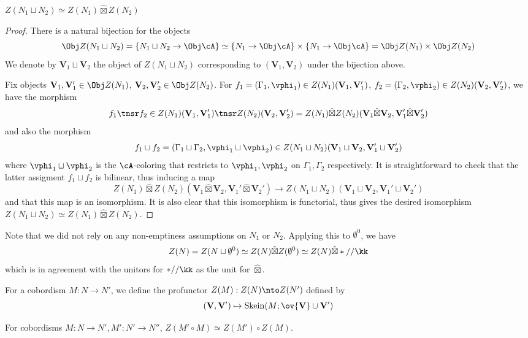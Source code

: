 \documentclass[12pt]{article}
\newcommand{\empt}[1]{{\emptyset^{#1}}}
\newcommand{\VV}{{\mathbf{V}}}
\DeclareMathOperator{\Skein}{Skein}
\newcommand{\hatbox}{{\hat{\boxtimes}}}
\begin{document}
\begin{proposition}
$Z(N_1 \sqcup N_2) \simeq Z(N_1) \hatbox Z(N_2)$
\end{proposition}

\begin{proof}
There is a natural bijection for the objects
\[
\Obj Z(N_1 \sqcup N_2) = \{N_1 \sqcup N_2 \to \Obj \cA\}
\simeq \{N_1 \to \Obj \cA\} \times \{N_1 \to \Obj \cA\}
= \Obj Z(N_1) \times \Obj Z(N_2)
\]
We denote by $\VV_1 \sqcup \VV_2$ the object of $Z(N_1 \sqcup N_2)$
corresponding to $(\VV_1,\VV_2)$ under the bijection above.

Fix objects $\VV_1,\VV_1' \in \Obj Z(N_1)$,
$\VV_2,\VV_2' \in \Obj Z(N_2)$.
For $f_1 = (\Gamma_1,\vphi_1) \in Z(N_1)(\VV_1,\VV_1')$,
$f_2 = (\Gamma_2,\vphi_2) \in Z(N_2)(\VV_2,\VV_2')$,
we have the morphism
\[
f_1 \tnsr f_2 \in
Z(N_1)(\VV_1,\VV_1') \tnsr Z(N_2)(\VV_2,\VV_2')
= Z(N_1) \hatbox Z(N_2)(\VV_1 \hatbox \VV_2, \VV_1' \hatbox \VV_2')
\]
and also the morphism
\[
f_1 \sqcup f_2 = (\Gamma_1 \sqcup \Gamma_2, \vphi_1 \sqcup \vphi_2)
\in Z(N_1 \sqcup N_2) (\VV_1 \sqcup \VV_2, \VV_1' \sqcup \VV_2')
\]
where $\vphi_1 \sqcup \vphi_2$ is the $\cA$-coloring that
restricts to $\vphi_1,\vphi_2$ on $\Gamma_1,\Gamma_2$ respectively.
It is straightforward to check that
the latter assigment $f_1 \sqcup f_2$ is bilinear,
thus inducing a map
\[
Z(N_1) \hatbox Z(N_2)(\VV_1 \hatbox \VV_2, \VV_1' \hatbox \VV_2')
\to Z(N_1 \sqcup N_2) (\VV_1 \sqcup \VV_2, \VV_1' \sqcup \VV_2')
\]
and that this map is an isomorphism.
It is also clear that this isomorphism is functorial,
thus gives the desired isomorphism
$Z(N_1 \sqcup N_2) \simeq Z(N_1) \hatbox Z(N_2)$.
\end{proof}

Note that we did not rely on any non-emptiness assumptions
on $N_1$ or $N_2$.
Applying this to $\empt{0}$,
we have
\[
Z(N) = Z(N \sqcup \empt{0}) \simeq Z(N) \hatbox Z(\empt{0})
\simeq Z(N) \hatbox *//\kk
\]
which is in agreement with the unitors for
$*//\kk$ as the unit for $\hatbox$.


\begin{definition}
For a cobordism $M : N \to N'$,
we define the profunctor
$Z(M): Z(N) \nto Z(N')$
defined by
\[
(\VV, \VV') \mapsto \Skein(M; \ov{\VV} \cup \VV')
\]
\end{definition}

\begin{proposition}
\label{p:1-cobord-compose}
For cobordisms $M: N \to N', M': N' \to N''$,
$Z(M' \circ M) \simeq Z(M') \circ Z(M)$.
\end{proposition}
\end{document}
